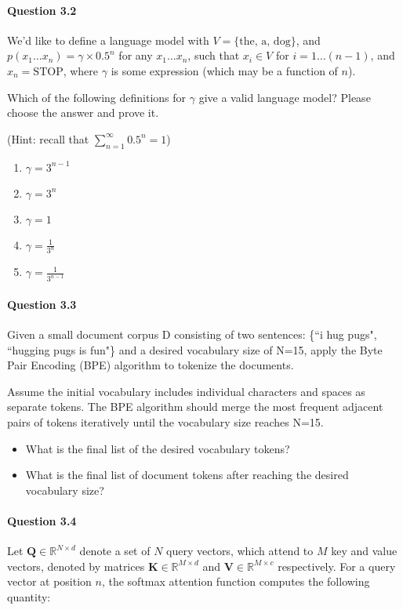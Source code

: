 \documentclass[10pt]{article}
\begin{document}
\newpage
\paragraph{Question 3.2}

We'd like to define a language model with \( V = \{\text{the, a, dog}\} \), and \( p(x_1 \ldots x_n) = \gamma \times 0.5^n \) for any \( x_1 \ldots x_n \), such that \( x_i \in V \) for \( i = 1 \ldots (n - 1) \), and \( x_n = \text{STOP} \), where \( \gamma \) is some expression (which may be a function of \( n \)).

Which of the following definitions for \( \gamma \) give a valid language model? Please choose the answer and prove it.

(Hint: recall that \( \sum_{n=1}^{\infty} 0.5^n = 1 \))

\begin{enumerate}
    \item \( \gamma = 3^{n-1} \)
    \item \( \gamma = 3^n \)
    \item \( \gamma = 1 \)
    \item \( \gamma = \frac{1}{3^n} \)
    \item \( \gamma = \frac{1}{3^{n-1}} \)
\end{enumerate}



\newpage
\paragraph{Question 3.3}
Given a small document corpus D consisting of two sentences: \{``i hug pugs", ``hugging pugs is fun"\} and a desired vocabulary size of N=15, apply the Byte Pair Encoding (BPE) algorithm to tokenize the documents.

Assume the initial vocabulary includes individual characters and spaces as separate tokens. The BPE algorithm should merge the most frequent adjacent pairs of tokens iteratively until the vocabulary size reaches N=15.


\begin{itemize}
    \item What is the final list of the desired vocabulary tokens?
    \item What is the final list of document tokens after reaching the desired vocabulary size?
\end{itemize}

\newpage
\paragraph{Question 3.4} Let $\mathbf{Q} \in \mathbb{R}^{N \times d}$ denote a set of $N$ query vectors, which attend to $M$ key and value vectors, denoted by matrices $\mathbf{K} \in \mathbb{R}^{M \times d}$ and $\mathbf{V} \in \mathbb{R}^{M \times c}$ respectively. For a query vector at position $n$, the softmax attention function computes the following quantity:
\end{document}
